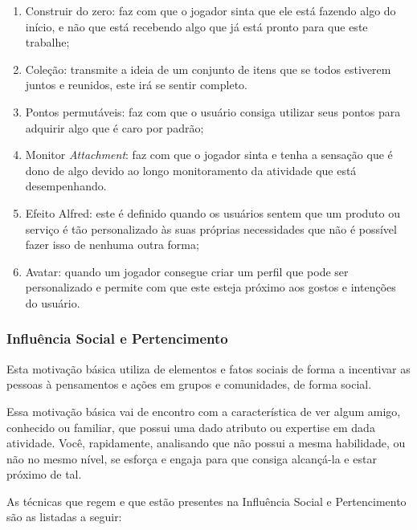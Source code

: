 \begin{enumerate}
    \item Construir do zero: faz com que o jogador sinta que ele está
        fazendo algo do início, e não que está recebendo algo que
        já está pronto para que este trabalhe;
    \item Coleção: transmite a ideia de um conjunto de itens que se todos
        estiverem juntos e reunidos, este irá se sentir completo.
    \item Pontos permutáveis: faz com que o usuário consiga utilizar
        seus pontos para adquirir algo que é caro por padrão;
    \item Monitor \textit{Attachment}: faz com que o jogador sinta e tenha a
        sensação que é dono de algo devido ao longo monitoramento
        da atividade que está desempenhando.
    \item Efeito Alfred: este é definido quando os usuários
        sentem que um produto ou serviço é tão personalizado às
        suas próprias necessidades que não é possível fazer isso
        de nenhuma outra forma;
    \item Avatar: quando um jogador consegue criar um perfil que pode ser
        personalizado e permite com que este esteja próximo aos gostos e
        intenções do usuário.
\end{enumerate}

\subsubsection{Influência Social e Pertencimento}
\label{sub:influenciasocialepertencimento}
Esta motivação básica utiliza de elementos e fatos sociais de forma
a incentivar as pessoas à pensamentos e ações em grupos e comunidades,
de forma social.

Essa motivação básica vai de encontro com a característica de ver algum
amigo, conhecido ou familiar, que possui uma dado atributo ou expertise
em dada atividade. Você, rapidamente, analisando que não possui a mesma
habilidade, ou não no mesmo nível, se esforça e engaja para que consiga
alcançá-la e estar próximo de tal.

As técnicas que regem e que estão presentes na Influência Social e Pertencimento
são as listadas a seguir:


